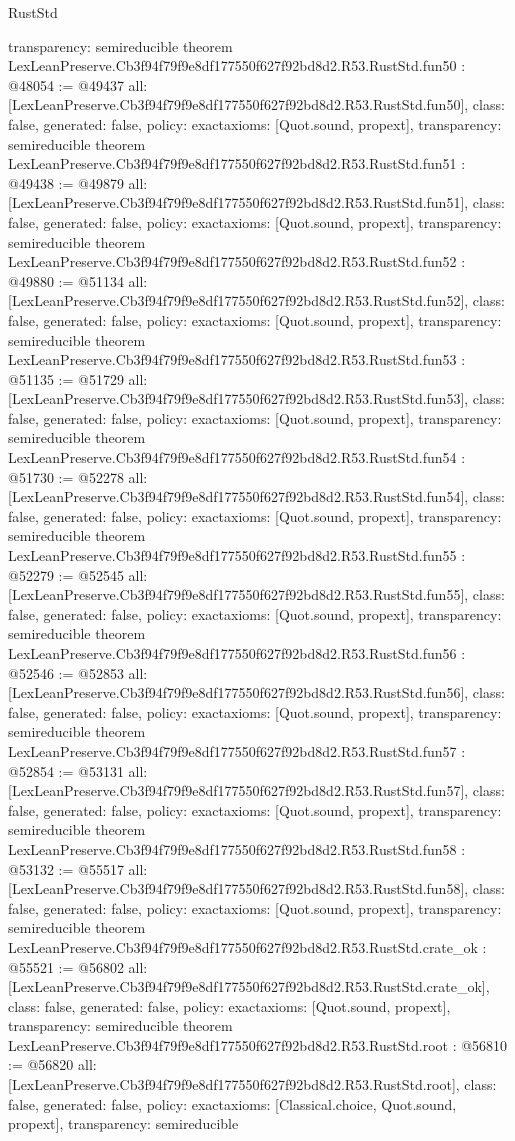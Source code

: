 \begin{lexlean}{RustStd}
\begin{coremodule}
{  transparency: semireducible
}
theorem LexLeanPreserve.Cb3f94f79f9e8df177550f627f92bd8d2.R53.RustStd.fun50 : @48054 := @49437 {
  all: [LexLeanPreserve.Cb3f94f79f9e8df177550f627f92bd8d2.R53.RustStd.fun50],
  class: false,
  generated: false,
  policy: exact{axioms: [Quot.sound, propext]},
  transparency: semireducible
}
theorem LexLeanPreserve.Cb3f94f79f9e8df177550f627f92bd8d2.R53.RustStd.fun51 : @49438 := @49879 {
  all: [LexLeanPreserve.Cb3f94f79f9e8df177550f627f92bd8d2.R53.RustStd.fun51],
  class: false,
  generated: false,
  policy: exact{axioms: [Quot.sound, propext]},
  transparency: semireducible
}
theorem LexLeanPreserve.Cb3f94f79f9e8df177550f627f92bd8d2.R53.RustStd.fun52 : @49880 := @51134 {
  all: [LexLeanPreserve.Cb3f94f79f9e8df177550f627f92bd8d2.R53.RustStd.fun52],
  class: false,
  generated: false,
  policy: exact{axioms: [Quot.sound, propext]},
  transparency: semireducible
}
theorem LexLeanPreserve.Cb3f94f79f9e8df177550f627f92bd8d2.R53.RustStd.fun53 : @51135 := @51729 {
  all: [LexLeanPreserve.Cb3f94f79f9e8df177550f627f92bd8d2.R53.RustStd.fun53],
  class: false,
  generated: false,
  policy: exact{axioms: [Quot.sound, propext]},
  transparency: semireducible
}
theorem LexLeanPreserve.Cb3f94f79f9e8df177550f627f92bd8d2.R53.RustStd.fun54 : @51730 := @52278 {
  all: [LexLeanPreserve.Cb3f94f79f9e8df177550f627f92bd8d2.R53.RustStd.fun54],
  class: false,
  generated: false,
  policy: exact{axioms: [Quot.sound, propext]},
  transparency: semireducible
}
theorem LexLeanPreserve.Cb3f94f79f9e8df177550f627f92bd8d2.R53.RustStd.fun55 : @52279 := @52545 {
  all: [LexLeanPreserve.Cb3f94f79f9e8df177550f627f92bd8d2.R53.RustStd.fun55],
  class: false,
  generated: false,
  policy: exact{axioms: [Quot.sound, propext]},
  transparency: semireducible
}
theorem LexLeanPreserve.Cb3f94f79f9e8df177550f627f92bd8d2.R53.RustStd.fun56 : @52546 := @52853 {
  all: [LexLeanPreserve.Cb3f94f79f9e8df177550f627f92bd8d2.R53.RustStd.fun56],
  class: false,
  generated: false,
  policy: exact{axioms: [Quot.sound, propext]},
  transparency: semireducible
}
theorem LexLeanPreserve.Cb3f94f79f9e8df177550f627f92bd8d2.R53.RustStd.fun57 : @52854 := @53131 {
  all: [LexLeanPreserve.Cb3f94f79f9e8df177550f627f92bd8d2.R53.RustStd.fun57],
  class: false,
  generated: false,
  policy: exact{axioms: [Quot.sound, propext]},
  transparency: semireducible
}
theorem LexLeanPreserve.Cb3f94f79f9e8df177550f627f92bd8d2.R53.RustStd.fun58 : @53132 := @55517 {
  all: [LexLeanPreserve.Cb3f94f79f9e8df177550f627f92bd8d2.R53.RustStd.fun58],
  class: false,
  generated: false,
  policy: exact{axioms: [Quot.sound, propext]},
  transparency: semireducible
}
theorem LexLeanPreserve.Cb3f94f79f9e8df177550f627f92bd8d2.R53.RustStd.crate_ok : @55521 := @56802 {
  all: [LexLeanPreserve.Cb3f94f79f9e8df177550f627f92bd8d2.R53.RustStd.crate_ok],
  class: false,
  generated: false,
  policy: exact{axioms: [Quot.sound, propext]},
  transparency: semireducible
}
theorem LexLeanPreserve.Cb3f94f79f9e8df177550f627f92bd8d2.R53.RustStd.root : @56810 := @56820 {
  all: [LexLeanPreserve.Cb3f94f79f9e8df177550f627f92bd8d2.R53.RustStd.root],
  class: false,
  generated: false,
  policy: exact{axioms: [Classical.choice, Quot.sound, propext]},
  transparency: semireducible
}


\end{coremodule}
\end{lexlean}
